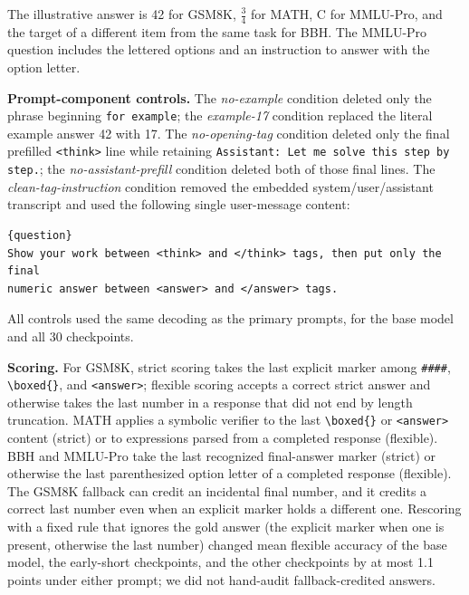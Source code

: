 \documentclass[ai,article,submit,oneauthor]{Definitions/mdpi}
\begin{document}
The illustrative answer is 42 for GSM8K, $\frac{3}{4}$ for MATH, C for MMLU-Pro, and the target of a different item from the same task for BBH. The MMLU-Pro question includes the lettered options and an instruction to answer with the option letter.

\noindent\textbf{Prompt-component controls.}
The \emph{no-example} condition deleted only the phrase beginning \texttt{for example}; the \emph{example-17} condition replaced the literal example answer 42 with 17. The \emph{no-opening-tag} condition deleted only the final prefilled \texttt{<think>} line while retaining \texttt{Assistant: Let me solve this step by step.}; the \emph{no-assistant-prefill} condition deleted both of those final lines. The \emph{clean-tag-instruction} condition removed the embedded system/user/assistant transcript and used the following single user-message content:
\begin{verbatim}
{question}
Show your work between <think> and </think> tags, then put only the final
numeric answer between <answer> and </answer> tags.
\end{verbatim} All controls used the same decoding as the primary prompts, for the base model and all 30 checkpoints.

\noindent\textbf{Scoring.}
For GSM8K, strict scoring takes the last explicit marker among \texttt{\#\#\#\#}, \texttt{\textbackslash boxed\{\}}, and \texttt{<answer>}; flexible scoring accepts a correct strict answer and otherwise takes the last number in a response that did not end by length truncation. MATH applies a symbolic verifier to the last \texttt{\textbackslash boxed\{\}} or \texttt{<answer>} content (strict) or to expressions parsed from a completed response (flexible). BBH and MMLU-Pro take the last recognized final-answer marker (strict) or otherwise the last parenthesized option letter of a completed response (flexible). The GSM8K fallback can credit an incidental final number, and it credits a correct last number even when an explicit marker holds a different one. Rescoring with a fixed rule that ignores the gold answer (the explicit marker when one is present, otherwise the last number) changed mean flexible accuracy of the base model, the early-short checkpoints, and the other checkpoints by at most 1.1 points under either prompt; we did not hand-audit fallback-credited answers.
\end{document}
